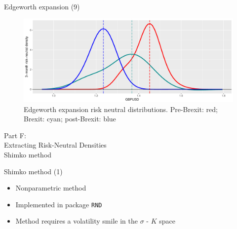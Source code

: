 \documentclass[ignorenonframetext,aspectratio=169]{beamer}
\providecommand{\tightlist}{%
  \setlength{\itemsep}{0pt}\setlength{\parskip}{0pt}}
\begin{document}
\begin{frame}{Edgeworth expansion (9)}

\begin{figure}
\includegraphics[width=1\linewidth]{2018_02_07_IMF_FXCourse_files/figure-beamer/unnamed-chunk-67-1} \caption{Edgeworth expansion risk neutral distributions. Pre-Brexit: red; Brexit: cyan; post-Brexit: blue}\label{fig:unnamed-chunk-67}
\end{figure}

\end{frame}

\begin{frame}{}

\color{blue} \LARGE{Part F:}\\
\LARGE{Extracting Risk-Neutral Densities}\\
\Large{Shimko method}

\end{frame}

\begin{frame}[fragile]{Shimko method (1)}

\begin{itemize}
\tightlist
\item
  Nonparametric method
\item
  Implemented in package \texttt{RND}
\item
  Method requires a volatility smile in the \(\sigma\) - \(K\) space
\end{itemize}

\end{frame}
\end{document}
